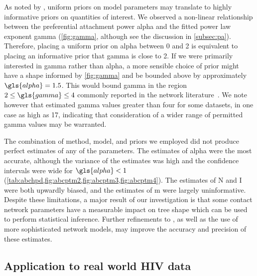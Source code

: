 As noted by \textcite{lintusaari2016identifiability}, uniform priors on model
parameters may translate to highly informative priors on quantities of
interest. We observed a non-linear relationship between the preferential
attachment power \gls{alpha} and the fitted power law exponent \gls{gamma}
(\cref{fig:gamma}, although see the discussion in \cref{subsec:pa}). Therefore,
placing a uniform prior on \gls{alpha} between 0 and 2 is equivalent to placing
an informative prior that \gls{gamma} is close to 2. If we were primarily
interested in \gls{gamma} rather than \gls{alpha}, a more sensible choice of
prior might have a shape informed by \cref{fig:gamma} and be bounded above by
approximately $\gls{alpha} = 1.5$. This would bound \gls{gamma} in the region
$2 \leq \gls{gamma} \leq 4$ commonly reported in the network
literature~\autocite{liljeros2001web, schneeberger2004scale, colgate1989risk,
clemenccon2015statistical, brown2011transmission}. We note however that
\textcite{jones2003assessment} estimated \gls{gamma} values greater than four
for some datasets, in one case as high as 17, indicating that consideration of
a wider range of permitted \gls{gamma} values may be warranted.

The combination of method, model, and priors we employed did not produce
perfect estimates of any of the parameters. The estimates of \gls{alpha} were
the most accurate, although the variance of the estimates was high and the
confidence intervals were wide for $\gls{alpha} < 1$
(\cref{tab:abchpd,fig:abcptm2,fig:abcptm3,fig:abcptm4}). The estimates of
\gls{N} and \gls{I} were both upwardly biased, and the estimates of \gls{m}
were largely uninformative. Despite these limitations, a major result of our
investigation is that some contact network parameters have a measurable impact
on tree shape which can be used to perform statistical inference. Further
refinements to , as well as the use of more sophisticated
network models, may improve the accuracy and precision of these estimates.

\subsection{Application to real world HIV data}

